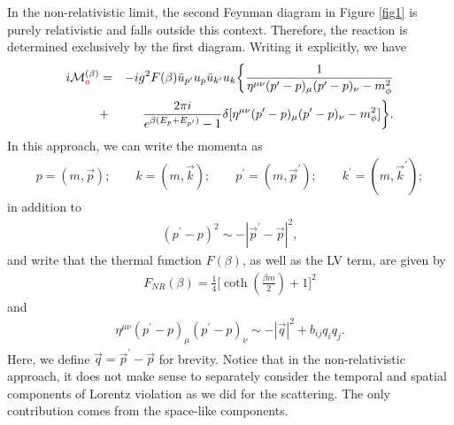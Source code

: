 \documentclass[11pt,showpacs,preprintnumbers,amsmath,amssymb,prd,nofootinbib,superscriptaddress]{revtex4-2}
\begin{document}
In the non-relativistic limit, the second Feynman diagram in Figure \ref{fig1} is purely relativistic and falls outside this context. Therefore, the reaction is determined exclusively by the first diagram. Writing it explicitly, we have
\begin{eqnarray}
    i\mathcal{M}_{\textcolor{red}{a}}^{(\beta)}&=&-ig^2F(\beta)\bar{u}_{p^\prime}u_p\bar{u}_{k^\prime}u_k\biggl\{\frac{1}{\eta^{\mu\nu}(p^\prime-p)_\mu(p^\prime-p)_\nu-m_{\phi}^2}\nonumber\\&+&\frac{2\pi i}{e^{\beta (E_{p}+E_{p^\prime})}-1}\delta[\eta^{\mu\nu}(p^\prime-p)_\mu(p^\prime-p)_\nu-m_\phi^2]\biggr\}.
\end{eqnarray}
In this approach, we can write the momenta as
\begin{eqnarray}
    p=(m,\vec{p});\quad\quad k=(m,\vec{k});\quad\quad p^\prime=(m,\vec{p}^\prime);\quad\quad k^\prime=(m,\vec{k}^\prime);\label{eq05}
\end{eqnarray}
in addition to
\begin{eqnarray}
    (p^\prime-p)^2\sim -|\vec{p}^\prime-\vec{p}|^2,\label{eq06}
\end{eqnarray}
and write that the thermal function $F(\beta)$, as well as the LV term, are given by
\begin{eqnarray}
    F_{NR}(\beta)=\frac{1}{4}\biggr[\coth{\left(\frac{\beta m}{2}\right)}+1\biggl]^2
\end{eqnarray}
and
\begin{eqnarray}
    \eta^{\mu\nu}(p^\prime-p)_\mu(p^\prime-p)_\nu\sim -|\vec{q}|^2+b_{ij}q_iq_j.
\end{eqnarray}
Here, we define $\vec{q}=\vec{p}^\prime-\vec{p}$ for brevity. Notice that in the non-relativistic approach, it does not make sense to separately consider the temporal and spatial components of Lorentz violation as we did for the scattering. The only contribution comes from the space-like components.
\end{document}
